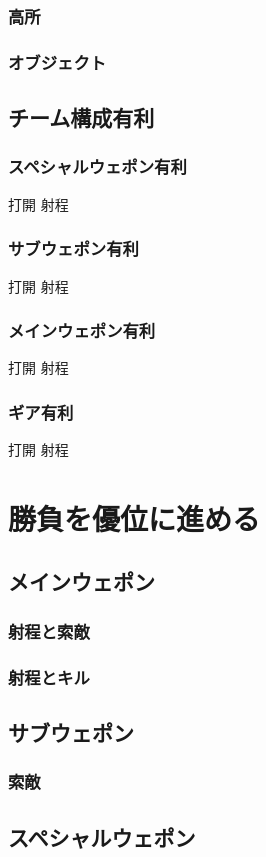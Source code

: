 \documentclass[a4paper,11pt]{jsbook}
\begin{document}
\section{高所}
\section{オブジェクト}
\chapter{チーム構成有利}
\section{スペシャルウェポン有利}
打開
射程
\section{サブウェポン有利}
打開
射程
\section{メインウェポン有利}
打開
射程
\section{ギア有利}
打開
射程

\part{勝負を優位に進める}
\chapter{メインウェポン}
\section{射程と索敵}
\section{射程とキル}
\chapter{サブウェポン}
\section{索敵}
\chapter{スペシャルウェポン}
\end{document}
